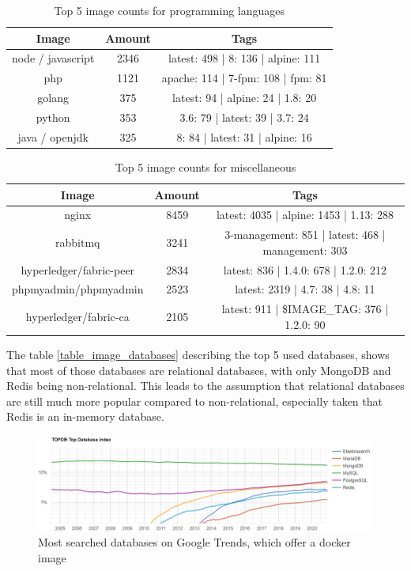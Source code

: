 \begin{table}[h!]
    \centering
    \begin{tabular}{ |c|c|c| }
    \hline
    Image & Amount & Tags \\
    \hline
         node / javascript & 2346 & latest: 498 | 8: 136 | alpine: 111\\
         php & 1121 & apache: 114 | 7-fpm: 108 | fpm: 81 \\
         golang & 375 & latest: 94 | alpine: 24 | 1.8: 20 \\
         python & 353 & 3.6: 79 | latest: 39 | 3.7: 24\\
         java / openjdk & 325 & 8: 84 | latest: 31 | alpine: 16\\
    \hline
    \end{tabular}
    \caption{Top 5 image counts for programming languages}
    \label{table_image_languages}
\end{table}

\begin{table}[h!]
    \centering
    \begin{tabular}{ |c|c|c| }
    \hline
    Image & Amount & Tags \\
    \hline
         nginx & 8459 & latest: 4035 | alpine: 1453 | 1.13: 288\\
         rabbitmq & 3241 & 3-management: 851 | latest: 468 | management: 303\\
         hyperledger/fabric-peer & 2834 & latest: 836 | 1.4.0: 678 | 1.2.0: 212\\
         phpmyadmin/phpmyadmin & 2523 & latest: 2319 | 4.7: 38 | 4.8: 11 \\
         hyperledger/fabric-ca & 2105 & latest: 911 | \$IMAGE\_TAG: 376 | 1.2.0: 90\\
    \hline
    \end{tabular}
    \caption{Top 5 image counts for miscellaneous}
    \label{table_image_misc}
\end{table}

The table \ref{table_image_databases} describing the top 5 used databases, shows that most of those databases are relational databases, with only MongoDB and Redis being non-relational. This leads to the assumption that relational databases are still much more popular compared to non-relational, especially taken that Redis is an in-memory database.

\begin{figure}[H]
    \centering
    \includegraphics[scale=0.5]{graphics/databases_top_popularity_ranking.png}
    \caption{Most searched databases on Google Trends, which offer a docker image}
    \label{fig:databases_top_ranking}
\end{figure}

